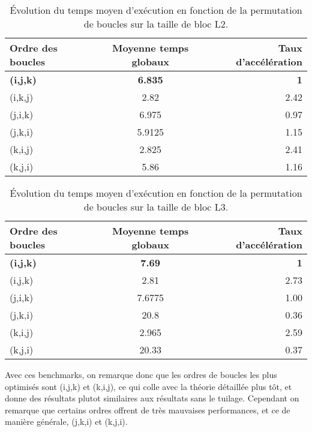 \documentclass{rapport}
\begin{document}
\begin{table}[H]
  \centering
  \begin{tabular}{ l|c|r }
    Ordre des boucles & Moyenne temps globaux & Taux d'accélération \\
    \hline
    \textbf{(i,j,k)} & \textbf{ 6.835 } & \textbf{1} \\
    (i,k,j) & 2.82 & 2.42 \\
    (j,i,k) & 6.975 & 0.97 \\
    (j,k,i) & 5.9125 & 1.15 \\
    (k,i,j) & 2.825 & 2.41 \\
    (k,j,i) & 5.86 & 1.16 \\
  \end{tabular}
  \label{Tableau 2}
  \caption{Évolution du temps moyen d'exécution en fonction de la permutation de boucles sur la taille de bloc L2.}
\end{table}

\begin{table}[H]
  \centering
  \begin{tabular}{ l|c|r }
    Ordre des boucles & Moyenne temps globaux & Taux d'accélération \\
    \hline
    \textbf{(i,j,k)} & \textbf{ 7.69 } & \textbf{1} \\
    (i,j,k) & 2.81 & 2.73 \\
    (j,i,k) & 7.6775 & 1.00 \\
    (j,k,i) & 20.8 & 0.36 \\
    (k,i,j) & 2.965 & 2.59 \\
    (k,j,i) & 20.33 & 0.37 \\
  \end{tabular}
  \label{Tableau 3}
  \caption{Évolution du temps moyen d'exécution en fonction de la permutation de boucles sur la taille de bloc L3.}
\end{table}

Avec ces benchmarks, on remarque donc que les ordres de boucles les plus optimisés sont (i,j,k) et (k,i,j), 
ce qui colle avec la théorie détaillée plus tôt, et donne des résultats plutot similaires aux résultats sans le tuilage.\newline
Cependant on remarque que certains ordres offrent de très mauvaises performances, et ce de manière générale, (j,k,i) et (k,j,i).
\end{document}
